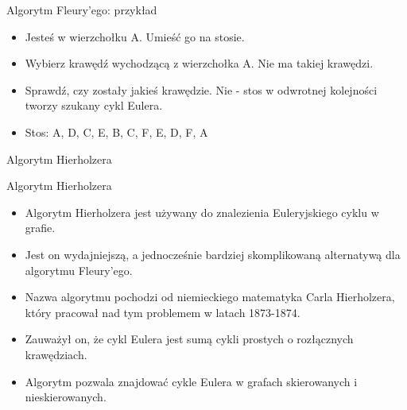 \documentclass[polish,envcountsect,10pt]{beamer}
\begin{document}
\begin{frame}{Algorytm Fleury'ego: przykład}
    \begin{itemize}
        \item Jesteś w wierzchołku A. Umieść go na stosie.
        \item Wybierz krawędź wychodzącą z wierzchołka A. Nie ma takiej krawędzi.
        \item Sprawdź, czy zostały jakieś krawędzie. Nie - stos w odwrotnej kolejności tworzy szukany cykl Eulera.
        \item Stos: A, D, C, E, B, C, F, E, D, F, A
    \end{itemize}
    \begin{center}
    \end{center}
\end{frame}

\begin{frame}{Algorytm Hierholzera}
    \begin{block}{Algorytm Hierholzera}
        \begin{itemize}
            \item Algorytm Hierholzera jest używany do znalezienia Euleryjskiego cyklu w grafie.
            \item Jest on wydajniejszą, a jednocześnie bardziej skomplikowaną alternatywą dla algorytmu Fleury'ego.
            \item Nazwa algorytmu pochodzi od niemieckiego matematyka Carla Hierholzera, który pracował nad tym problemem w latach 1873-1874.
            \item Zauważył on, że cykl Eulera jest sumą cykli prostych o rozłącznych krawędziach.
            \item Algorytm pozwala znajdować cykle Eulera w grafach skierowanych i nieskierowanych.
        \end{itemize}
    \end{block}
\end{frame}
    
\end{document}
